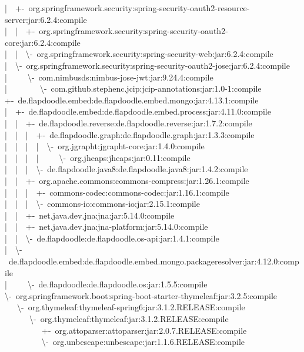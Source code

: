 |~~+-~org.springframework.security:spring-security-oauth2-resource-server:jar:6.2.4:compile\\
|~~|~~+-~org.springframework.security:spring-security-oauth2-core:jar:6.2.4:compile\\
|~~|~~\textbackslash-~org.springframework.security:spring-security-web:jar:6.2.4:compile\\
|~~\textbackslash-~org.springframework.security:spring-security-oauth2-jose:jar:6.2.4:compile\\
|~~~~~\textbackslash-~com.nimbusds:nimbus-jose-jwt:jar:9.24.4:compile\\
|~~~~~~~~\textbackslash-~com.github.stephenc.jcip:jcip-annotations:jar:1.0-1:compile\\
+-~de.flapdoodle.embed:de.flapdoodle.embed.mongo:jar:4.13.1:compile\\
|~~+-~de.flapdoodle.embed:de.flapdoodle.embed.process:jar:4.11.0:compile\\
|~~|~~+-~de.flapdoodle.reverse:de.flapdoodle.reverse:jar:1.7.2:compile\\
|~~|~~|~~+-~de.flapdoodle.graph:de.flapdoodle.graph:jar:1.3.3:compile\\
|~~|~~|~~|~~\textbackslash-~org.jgrapht:jgrapht-core:jar:1.4.0:compile\\
|~~|~~|~~|~~~~~\textbackslash-~org.jheaps:jheaps:jar:0.11:compile\\
|~~|~~|~~\textbackslash-~de.flapdoodle.java8:de.flapdoodle.java8:jar:1.4.2:compile\\
|~~|~~+-~org.apache.commons:commons-compress:jar:1.26.1:compile\\
|~~|~~|~~+-~commons-codec:commons-codec:jar:1.16.1:compile\\
|~~|~~|~~\textbackslash-~commons-io:commons-io:jar:2.15.1:compile\\
|~~|~~+-~net.java.dev.jna:jna:jar:5.14.0:compile\\
|~~|~~+-~net.java.dev.jna:jna-platform:jar:5.14.0:compile\\
|~~|~~\textbackslash-~de.flapdoodle:de.flapdoodle.os-api:jar:1.4.1:compile\\
|~~\textbackslash-~de.flapdoodle.embed:de.flapdoodle.embed.mongo.packageresolver:jar:4.12.0:compile\\
|~~~~~\textbackslash-~de.flapdoodle:de.flapdoodle.os:jar:1.5.5:compile\\
\textbackslash-~org.springframework.boot:spring-boot-starter-thymeleaf:jar:3.2.5:compile\\
~~~\textbackslash-~org.thymeleaf:thymeleaf-spring6:jar:3.1.2.RELEASE:compile\\
~~~~~~\textbackslash-~org.thymeleaf:thymeleaf:jar:3.1.2.RELEASE:compile\\
~~~~~~~~~+-~org.attoparser:attoparser:jar:2.0.7.RELEASE:compile\\
~~~~~~~~~\textbackslash-~org.unbescape:unbescape:jar:1.1.6.RELEASE:compile\\

